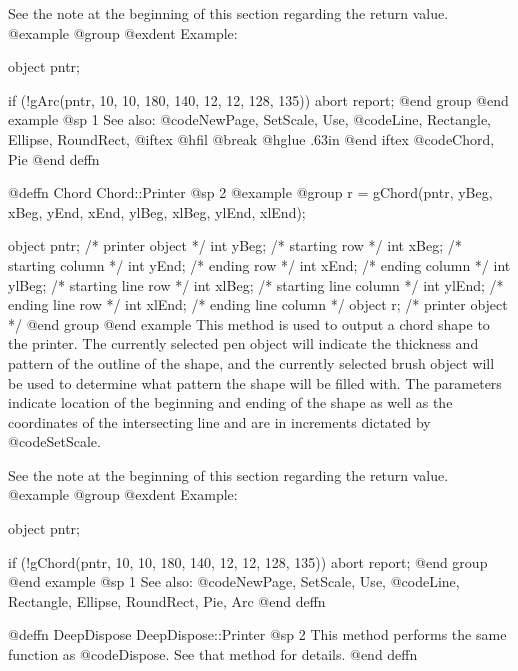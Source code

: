 See the note at the beginning of this section regarding the return value.
@example
@group
@exdent Example:

object  pntr;

if (!gArc(pntr, 10, 10, 180, 140, 12, 12, 128, 135))
        abort report;
@end group
@end example
@sp 1
See also:  @code{NewPage, SetScale, Use,}
        @code{Line, Rectangle, Ellipse, RoundRect,}
@iftex
@hfil @break @hglue .63in 
@end iftex
@code{Chord, Pie}
@end deffn












@deffn {Chord} Chord::Printer
@sp 2
@example
@group
r = gChord(pntr, yBeg, xBeg, yEnd, xEnd,
                 ylBeg, xlBeg, ylEnd, xlEnd);

object  pntr;   /*  printer object         */
int     yBeg;   /*  starting row           */
int     xBeg;   /*  starting column        */
int     yEnd;   /*  ending row             */
int     xEnd;   /*  ending column          */
int     ylBeg;  /*  starting line row      */
int     xlBeg;  /*  starting line column   */
int     ylEnd;  /*  ending line row        */
int     xlEnd;  /*  ending line column     */
object  r;      /*  printer object         */
@end group
@end example
This method is used to output a chord shape to the printer.  The
currently selected pen object will indicate the thickness and pattern of
the outline of the shape, and the currently selected brush object will
be used to determine what pattern the shape will be filled with.  The
parameters indicate location of the beginning and ending of the shape as
well as the coordinates of the intersecting line and are in increments
dictated by @code{SetScale}.

See the note at the beginning of this section regarding the return value.
@example
@group
@exdent Example:

object  pntr;

if (!gChord(pntr, 10, 10, 180, 140, 12, 12, 128, 135))
        abort report;
@end group
@end example
@sp 1
See also:  @code{NewPage, SetScale, Use,}
        @code{Line, Rectangle, Ellipse, RoundRect, Pie, Arc}
@end deffn








@deffn {DeepDispose} DeepDispose::Printer
@sp 2
This method performs the same function as @code{Dispose}.  See that
method for details.
@end deffn





